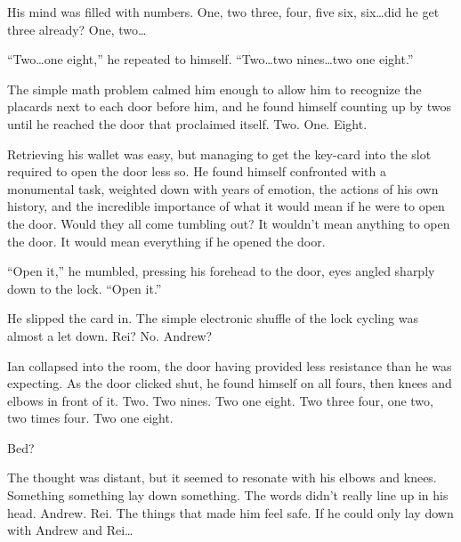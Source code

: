 His mind was filled with numbers.  One, two three, four, five six, six\ldots{}did he get three already?  One, two\ldots{}

``Two\ldots{}one eight,'' he repeated to himself. ``Two\ldots{}two nines\ldots{}two one eight.''

The simple math problem calmed him enough to allow him to recognize the placards next to each door before him, and he found himself counting up by twos until he reached the door that proclaimed itself. Two. One. Eight.

Retrieving his wallet was easy, but managing to get the key-card into the slot required to open the door less so. He found himself confronted with a monumental task, weighted down with years of emotion, the actions of his own history, and the incredible importance of what it would mean if he were to open the door.  Would they all come tumbling out?  It wouldn't mean anything to open the door.  It would mean everything if he opened the door.

``Open it,'' he mumbled, pressing his forehead to the door, eyes angled sharply down to the lock. ``Open it.''

He slipped the card in. The simple electronic shuffle of the lock cycling was almost a let down. Rei? No. Andrew?

Ian collapsed into the room, the door having provided less resistance than he was expecting. As the door clicked shut, he found himself on all fours, then knees and elbows in front of it. Two. Two nines. Two one eight. Two three four, one two, two times four. Two one eight.

Bed?

The thought was distant, but it seemed to resonate with his elbows and knees. Something something lay down something. The words didn't really line up in his head. Andrew. Rei. The things that made him feel safe. If he could only lay down with Andrew and Rei\ldots{}
